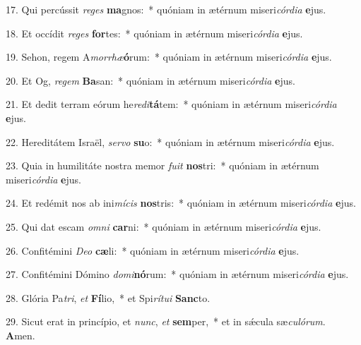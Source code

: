 17. Qui percússit \textit{re}\textit{ges} \textbf{ma}gnos:~*  quóniam in ætérnum miseri\textit{cór}\textit{di}\textit{a} \textbf{e}jus.\

18. Et occídit \textit{re}\textit{ges} \textbf{for}tes:~*  quóniam in ætérnum miseri\textit{cór}\textit{di}\textit{a} \textbf{e}jus.\

19. Sehon, regem A\textit{mor}\textit{rhæ}\textbf{ó}rum:~*  quóniam in ætérnum miseri\textit{cór}\textit{di}\textit{a} \textbf{e}jus.\

20. Et Og, \textit{re}\textit{gem} \textbf{Ba}san:~*  quóniam in ætérnum miseri\textit{cór}\textit{di}\textit{a} \textbf{e}jus.\

21. Et dedit terram eórum he\textit{re}\textit{di}\textbf{tá}tem:~*  quóniam in ætérnum miseri\textit{cór}\textit{di}\textit{a} \textbf{e}jus.\

22. Hereditátem Israël, \textit{ser}\textit{vo} \textbf{su}o:~*  quóniam in ætérnum miseri\textit{cór}\textit{di}\textit{a} \textbf{e}jus.\

23. Quia in humilitáte nostra memor \textit{fu}\textit{it} \textbf{nos}tri:~*  quóniam in ætérnum miseri\textit{cór}\textit{di}\textit{a} \textbf{e}jus.\

24. Et redémit nos ab ini\textit{mí}\textit{cis} \textbf{nos}tris:~*  quóniam in ætérnum miseri\textit{cór}\textit{di}\textit{a} \textbf{e}jus.\

25. Qui dat escam \textit{om}\textit{ni} \textbf{car}ni:~*  quóniam in ætérnum miseri\textit{cór}\textit{di}\textit{a} \textbf{e}jus.\

26. Confitémini \textit{De}\textit{o} \textbf{cæ}li:~*  quóniam in ætérnum miseri\textit{cór}\textit{di}\textit{a} \textbf{e}jus.\

27. Confitémini Dómino \textit{do}\textit{mi}\textbf{nó}rum:~*  quóniam in ætérnum miseri\textit{cór}\textit{di}\textit{a} \textbf{e}jus.\

28. Glória Pa\textit{tri}, \textit{et} \textbf{Fí}lio,~*  et Spi\textit{rí}\textit{tu}\textit{i} \textbf{Sanc}to.\

29. Sicut erat in princípio, et \textit{nunc}, \textit{et} \textbf{sem}per,~*  et in sǽcula sæ\textit{cu}\textit{ló}\textit{rum}. \textbf{A}men.\

